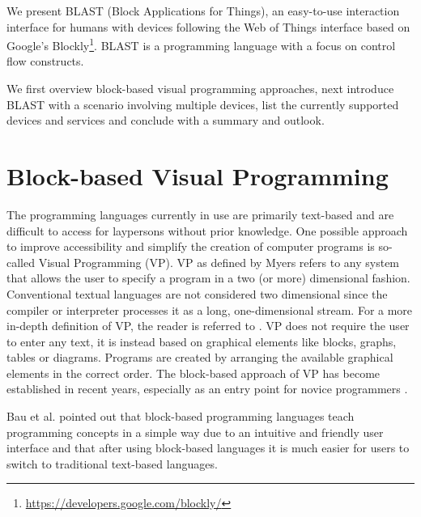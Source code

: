 \documentclass[runningheads]{llncs}
\begin{document}
We present BLAST (Block Applications for Things), an easy-to-use interaction interface for humans with devices following the Web of Things interface based on Google's Blockly\footnote{\url{https://developers.google.com/blockly/}}.
BLAST is a programming language with a focus on control flow constructs.

We first overview block-based visual programming approaches, next introduce BLAST with a scenario involving multiple devices, list the currently supported devices and services and conclude with a summary and outlook.

\section{Block-based Visual Programming}

The programming languages currently in use are primarily text-based and are difficult to access for laypersons without prior knowledge.
One possible approach to improve accessibility and simplify the creation of computer programs is so-called Visual Programming (VP).
VP as defined by Myers \cite{myers1990taxonomies} refers to any system that allows the user to specify a program in a two (or more) dimensional fashion. Conventional textual languages are not considered two dimensional since the compiler or interpreter processes it as a long, one-dimensional stream. For a more in-depth definition of VP, the reader is referred to \cite{burnett1995visual}. 
VP does not require the user to enter any text, it is instead based on graphical elements like blocks, graphs, tables or diagrams.
Programs are created by arranging the available graphical elements in the correct order.
The block-based approach of VP has become established in recent years, especially as an entry point for novice programmers 
\cite{moors2018transitioning} \cite{weintrop2017blocks} \cite{chao2016exploring} \cite{HUNDHAUSEN200722} \cite{10.1145/2787622.2787712}.

Bau et al. \cite{1011453015455} pointed out that block-based programming languages teach programming concepts in a simple way due to an intuitive and friendly user interface and that after using block-based languages it is much easier for users to switch to traditional text-based languages.
\end{document}
